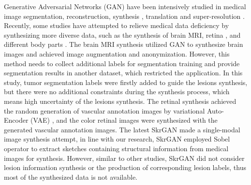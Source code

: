 \documentclass[runningheads]{llncs}
\begin{document}
	Generative Adversarial Networks (GAN) have been intensively studied in medical image segmentation\cite{40kamnitsas2017unsupervised}, reconstruction\cite{61fan2018a}, synthesis \cite{41costa2017towards,4shin2018medical,43iglesias2013is,44shrivastava2017learning}, translation \cite{2zhang2018translating,20nie2017medical,35osokin2017gans,36vannguyen2015crossdomain,40kamnitsas2017unsupervised,136yi2018sharpness-aware,137yang2018low-dose,138WolterinkGenerative} and super-resolution \cite{14You2018CT}.
	Recently, some studies have attempted to relieve medical data deficiency by synthesizing more diverse data, such as the synthesis of brain MRI\cite{4shin2018medical}, retina \cite{41costa2017towards}, and different body parts \cite{96zhang2019skrgan:}. The brain MRI synthesis \cite{4shin2018medical} utilized GAN to synthesize brain images and achieved image augmentation and anonymization. However, this method needs to collect additional labels for segmentation training and provide segmentation results in another dataset, which restricted the application. In this study, tumor segmentation labels were firstly added to guide the lesions synthesis, but there were no additional constraints during the synthesis process, which means high uncertainty of the lesions synthesis. The retinal synthesis \cite{41costa2017towards} achieved the random generation of vascular annotation images by variational Auto-Encoder (VAE) \cite{88rezende2014stochastic}, and the color retinal images were synthesized with the generated vascular annotation images. The latest SkrGAN\cite{96zhang2019skrgan:} made a single-modal image synthesis attempt, in line with our research, SkrGAN employed Sobel operator to extract sketches containing structural information from medical images for synthesis. However, similar to other studies, SkrGAN did not consider lesion information synthesis or the production of corresponding lesion labels, thus most of the synthesized data is not available.
	
\end{document}
